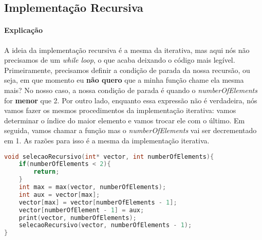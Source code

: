 \subsection{Implementação Recursiva}
\paragraph{Explicação}
A ideia da implementação recursiva é a mesma da iterativa, mas aqui nós não precisamos de um \textit{while loop}, o que acaba deixando o código mais legível. Primeiramente, precisamos
definir a condição de parada da nossa recursão, ou seja, em que momento eu \textbf{não quero} que a minha função chame ela mesma mais? No nosso caso, a nossa condição de parada é
quando o \textit{numberOfElements} for \textbf{menor} que 2. Por outro lado, enquanto essa expressão não é verdadeira, nós vamos fazer os mesmos procedimentos da implementação
iterativa: vamos determinar o índice do maior elemento e vamos trocar ele com o último. Em seguida, vamos chamar a função mas o \textit{numberOfElements} vai ser decrementado em 1.
As razões para isso é a mesma da implementação iterativa.
\begin{lstlisting}[language=C]
void selecaoRecursivo(int* vector, int numberOfElements){
    if(numberOfElements < 2){
        return;
    }
    int max = max(vector, numberOfElements);
    int aux = vector[max];
    vector[max] = vector[numberOfElements - 1];
    vector[numberOfElement - 1] = aux;
    print(vector, numberOfElements);
    selecaoRecursivo(vector, numberOfElements - 1);
}
\end{lstlisting}
